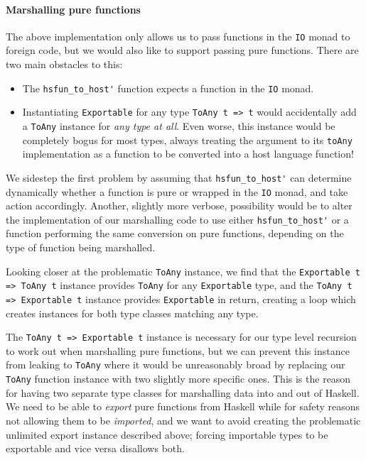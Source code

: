 \documentclass[preprint]{sigplanconf}
\begin{document}
\paragraph{Marshalling pure functions}
The above implementation only allows us to pass functions in the \lstinline!IO!
monad to foreign code, but we would also like to support passing pure
functions. There are two main obstacles to this:

\begin{itemize}
\item
  The \lstinline!hsfun_to_host'! function expects a function in the
  \lstinline!IO! monad.
\item
  Instantiating \lstinline!Exportable! for any type \lstinline!ToAny t => t!
  would accidentally add a \lstinline!ToAny! instance for
  \emph{any type at all}.
  Even worse, this instance would be completely bogus for most types,
  always treating
  the argument to its \lstinline!toAny! implementation as a function to be
  converted into a host language function!
\end{itemize}

We sidestep the first problem by assuming that \lstinline!hsfun_to_host'!
can determine dynamically whether a function is pure or wrapped in the
\lstinline!IO! monad, and take action accordingly.
Another, slightly more verbose, possibility would be to alter the
implementation of our marshalling code to use either
\lstinline!hsfun_to_host'! or a function performing the same conversion
on pure functions, depending on the type of function being marshalled.

Looking closer at the problematic \lstinline!ToAny! instance, we find that
the \lstinline!Exportable t => ToAny t! instance provides
\lstinline!ToAny! for any \lstinline!Exportable! type, and the
\lstinline!ToAny t => Exportable t! instance provides \lstinline!Exportable! in
return, creating a loop which creates instances for both type classes
matching any type.

The \lstinline!ToAny t => Exportable t! instance is necessary
for our type level recursion to work out when marshalling pure functions,
but we can prevent this instance from leaking to \lstinline!ToAny! where it
would be unreasonably broad by replacing our \lstinline!ToAny! function
instance with two slightly more specific ones.
This is the reason for having two separate type classes for marshalling
data into and out of Haskell. We need to be able to \emph{export} pure
functions from Haskell while for safety reasons not allowing them to be
\emph{imported}, and we want to avoid creating the problematic unlimited
export instance described above; forcing importable types to be
exportable and vice versa disallows both.
\end{document}
